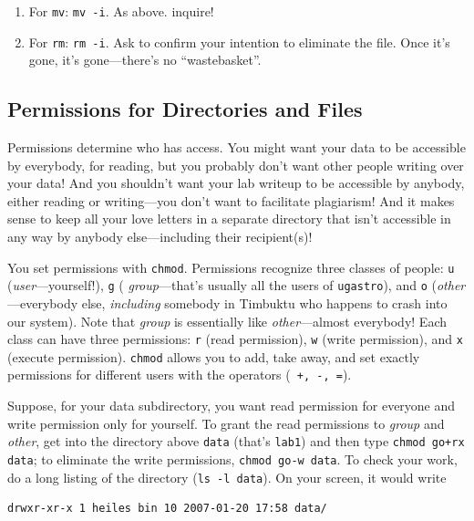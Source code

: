 \documentclass[]{article}
\begin{document}
\begin{enumerate}
\begin{enumerate}
\item For {\tt mv}: {\tt mv -i}. As above. inquire!

\item For {\tt rm}: {\tt rm -i}. Ask to confirm your intention to
  eliminate the file. Once it's gone, it's gone---there's no
  ``wastebasket''. 
\end{enumerate}

\end{enumerate}

\subsection{Permissions for Directories and Files} \label{perm}

Permissions determine who has access. You might want your data to be
accessible by everybody, for reading, but you probably don't want other
people writing over your data!  And you shouldn't want your lab writeup
to be accessible by anybody, either reading or writing---you don't want
to facilitate plagiarism! And it makes sense to keep all your love
letters in a separate directory that isn't accessible in any way by
anybody else---including their recipient(s)!

You set permissions with {\tt chmod}.  Permissions recognize three
classes of people: {\tt u} ({\it user}---yourself!), {\tt g} ({\it
group}---that's usually all the users of {\tt ugastro}), and {\tt o}
({\it other}---everybody else, {\it including} somebody in Timbuktu who
happens to crash into our system). Note that {\it group} is essentially
like {\it other}---almost everybody! Each class can have three
permissions: {\tt r} (read permission), {\tt w} (write permission), and
{\tt x} (execute permission).  {\tt chmod} allows you to add, take away,
and set exactly permissions for different users with the operators ({\tt
+, -, =}).

Suppose, for your data subdirectory, you want read permission for
everyone and write permission only for yourself. To grant the read
permissions to {\it group} and {\it other}, get into the directory above
{\tt data} (that's {\tt lab1}) and then type {\tt chmod go+rx data}; to
eliminate the write permissions, {\tt chmod go-w data}. To check your
work, do a long listing of the directory ({\tt ls -l data}). On your
screen, it would write

\begin{verbatim}
drwxr-xr-x 1 heiles bin 10 2007-01-20 17:58 data/
\end{verbatim}
\end{document}
